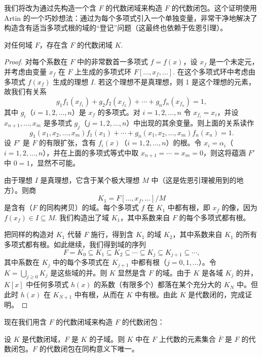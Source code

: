 我们将改为通过先构造一个含 \(F\) 的代数闭域来构造 \(F\) 的代数闭包。这个证明使用 Artin 的一个巧妙想法：通过为每个多项式引入一个单独变量，非常干净地解决了构造含有适当多项式根的域的“登记”问题（这最终也依赖于佐恩引理）。

\begin{proposition}\label{pro:13.30}
对任何域 \(F\)，存在含 \(F\) 的代数闭域 \(K\).
\end{proposition}

\begin{proof}
对每个系数在 \(F\) 中的非常数首一多项式 \(f = f(x)\)，设 \(x_f\) 是一个未定元，并考虑由变量 \(x_f\) 在 \(F\) 上生成的多项式环 \(F[\ldots, x_f, \ldots]\). 在这个多项式环中考虑由多项式 \(f(x_f)\) 生成的理想 \(I\). 若这个理想不是真理想，则 1 是这个理想的元素，故我们有关系
\[
g_1f_1(x_{f_1})+g_2f_2(x_{f_2})+\cdots+g_nf_n(x_{f_n}) = 1,
\]
其中 \(g_i\)（\(i = 1, 2, \ldots, n\)）是 \(x_f\) 的多项式。对 \(i = 1, 2, \ldots, n\) 令 \(x_{f_i} = x_i\)，并设 \(x_{n+1}, \ldots, x_m\) 是多项式 \(g_j\)（\(j = 1, 2, \ldots, n\)）中出现的其余变量。则上面的关系读作
\[
g_1(x_1, x_2, \ldots, x_m)f_1(x_1)+\cdots+g_n(x_1, x_2, \ldots, x_m)f_n(x_n) = 1.
\]
设 \(F'\) 是 \(F\) 的有限扩张，含有 \(f_i(x)\)（\(i = 1, 2, \ldots, n\)）的根。令 \(x_i = \alpha_i\)（\(i = 1, 2, \ldots, n\)），并在上面的多项式等式中取 \(x_{n+1} = \cdots = x_m = 0\)，则这将蕴涵 \(F'\) 中 \(0 = 1\)，显然不可能。

由于理想 \(I\) 是真理想，它含于某个极大理想 \(M\) 中（这是佐恩引理被用到的地方）。则商
\[
K_1 = F[\ldots, x_f, \ldots]/M
\]
是含有（\(F\) 的同构拷贝）的域。每个多项式 \(f\) 在 \(K_1\) 中都有根，即 \(x_f\) 的像，因为 \(f(x_f) \in I \subseteq M\). 我们构造出了域 \(K_1\)，其中系数来自 \(F\) 的每个多项式都有根。

把同样的构造对 \(K_1\) 代替 \(F\) 施行，得到含 \(K_1\) 的域 \(K_2\)，其中系数来自 \(K_1\) 的所有多项式都有根。如此继续，我们得到域的序列
\[
F = K_0 \subseteq K_1 \subseteq K_2 \subseteq \cdots \subseteq K_j \subseteq K_{j+1} \subseteq \cdots,
\]
其中系数在 \(K_j\) 中的每个多项式在 \(K_{j+1}\) 中都有根（\(j = 0, 1, \ldots\)）。令 \(K = \bigcup_{j\geq0}K_j\) 是这些域的并。则 \(K\) 显然是含 \(F\) 的域。由于 \(K\) 是各域 \(K_j\) 的并，\(K[x]\) 中任何多项式 \(h(x)\) 的系数（有限多个）都落在某个充分大的 \(K_N\) 中。但此时 \(h(x)\) 在 \(K_{N+1}\) 中有根，从而在 \(K\) 中有根。由此 \(K\) 是代数闭的，完成证明。
\end{proof}

现在我们用含 \(F\) 的代数闭域来构造 \(F\) 的代数闭包：

\begin{proposition}\label{pro:13.31}
设 \(K\) 是代数闭域，\(F\) 是 \(K\) 的子域。则 \(K\) 中在 \(F\) 上代数的元素集合 \(\overline{F}\) 是 \(F\) 的代数闭包。\(F\) 的代数闭包在同构意义下唯一。
\end{proposition}


